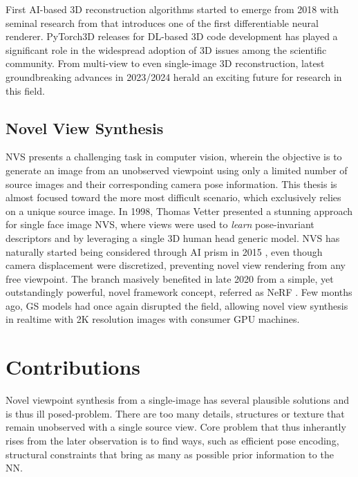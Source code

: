 First \ac{AI}-based 3D reconstruction algorithms started to emerge from 2018 with seminal research from \citep{kato2018neural} that introduces one of the first differentiable neural renderer. PyTorch3D \citep{ravi2020pytorch3d} releases for  \ac{DL}-based 3D code development has played a significant role in the widespread adoption of 3D issues among the scientific community. From multi-view \citep{li2023neuralangelo} to even single-image \citep{voleti2024sv3d} 3D reconstruction, latest groundbreaking advances in 2023/2024 herald an exciting future for research in this field. 

\subsection{Novel View Synthesis}
\ac{NVS} presents a challenging task in computer vision, wherein the objective is to generate an image from an unobserved viewpoint using only a limited number of source images and their corresponding camera pose information. This thesis is almost focused toward the more most difficult scenario, which exclusively relies on a unique source image. In 1998, Thomas Vetter presented a stunning approach \cite{vetter1998synthesis} for single face image \ac{NVS}, where views were used to \textit{learn} pose-invariant descriptors and by leveraging a single 3D human head generic model. \ac{NVS} has naturally started being considered through \ac{AI} prism in 2015 \citep{yang2015weakly}, even though camera displacement were discretized, preventing novel view rendering from any free viewpoint. The branch masively benefited in late 2020 from a simple, yet outstandingly powerful, novel framework concept, referred as \ac{NeRF} \cite{mildenhall2020nerf}. Few months ago, \ac{GS} models had once again disrupted the field, allowing novel view synthesis in realtime with 2K resolution images with consumer \ac{GPU} machines. 


\section{Contributions}
Novel viewpoint synthesis from a single-image has several plausible solutions and is thus ill posed-problem. There are too many details, structures or texture that remain unobserved with a single source view. Core problem that thus inherantly rises from the later observation is to find ways, such as efficient pose encoding, structural constraints that bring as many as possible prior information to the \ac{NN}. 

